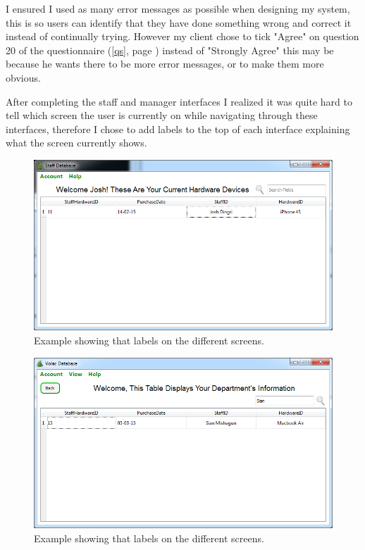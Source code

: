 I ensured I used as many error messages as possible when designing my system, this is so users can identify that they have done something wrong and correct it instead of continually trying. However my client chose to tick "Agree" on question 20 of the questionnaire (\ref{qs}, page \pageref{qs}) instead of "Strongly Agree" this may be because he wants there to be more error messages, or to make them more obvious.

After completing the staff and manager interfaces I realized it was quite hard to tell which screen the user is currently on while navigating through these interfaces, therefore I chose to add labels to the top of each interface explaining what the screen currently shows.

\begin{figure}[H]
    \includegraphics[width=\textwidth]{./Evaluation/Images/readonlystaff.png}
    \caption{Example showing that labels on the different screens.}
\end{figure}

\begin{figure}[H]
    \includegraphics[width=\textwidth]{./Evaluation/Images/managersearch.png}
    \caption{Example showing that labels on the different screens.} 
\end{figure}

